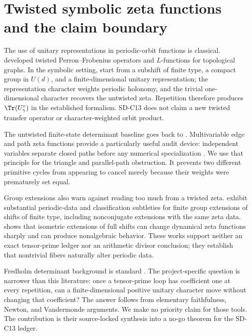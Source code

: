 \section{Twisted symbolic zeta functions and the claim boundary}
\label{sec:related}

The use of unitary representations in periodic-orbit functions is classical.
\citet{adachisunada1987} developed twisted Perron--Frobenius operators and
$L$-functions for topological graphs.  In the symbolic setting,
\citet[Chapter~8]{parrypollicott1990} start from a subshift of finite type, a
compact group in $U(d)$, and a finite-dimensional unitary representation;
the representation character weights periodic holonomy, and the trivial
one-dimensional character recovers the untwisted zeta.  Repetition therefore
produces $\Tr(U_\gamma^r)$ in the established formalism.  SD-C13 does not
claim a new twisted transfer operator or character-weighted orbit product.

The untwisted finite-state determinant baseline goes back to
\citet{bowenlanford1970}.  Multivariable edge and path zeta functions provide
a particularly useful audit device: independent variables separate closed
paths before any numerical specialization \citep{starkterras1996}.  We use
that principle for the triangle and parallel-path obstruction.  It prevents
two different primitive cycles from appearing to cancel merely because their
weights were prematurely set equal.

Group extensions also warn against reading too much from a twisted zeta.
\citet{boyleschmieding2017} exhibit substantial periodic-data and
classification subtleties for finite group extensions of shifts of finite
type, including nonconjugate extensions with the same zeta data.
\citet{ward1999} shows that isometric extensions of full shifts can change
dynamical zeta functions sharply and can produce nonalgebraic behavior.
These works support neither an exact tensor-prime ledger nor an arithmetic
divisor conclusion; they establish that nontrivial fibers naturally alter
periodic data.

Fredholm determinant background is standard \citep{simon1977}.  The
project-specific question is narrower than this literature: once a
tensor-prime loop has coefficient one at every repetition, can a
finite-dimensional positive unitary character move without changing that
coefficient?  The answer follows from elementary faithfulness, Newton, and
Vandermonde arguments.  We make no priority claim for those tools.  The
contribution is their source-locked synthesis into a no-go theorem for the
SD-C13 ledger.
